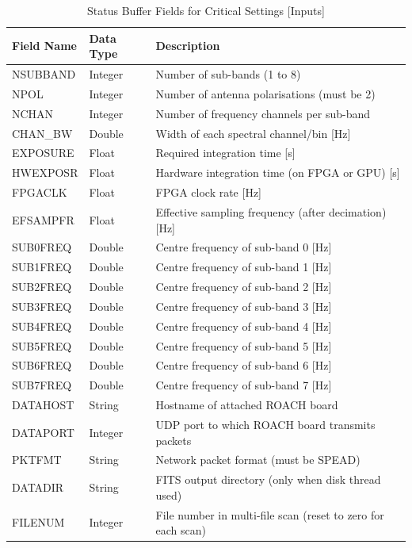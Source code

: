 \documentclass[11pt]{article} %
\begin{document}
\begin{table}[!h]
\centering
\caption{Status Buffer Fields for Critical Settings [Inputs]}
\begin{tabular}{l l l}
\hline
\bf Field Name & \bf Data Type & \bf Description \\
\hline
NSUBBAND & Integer & Number of sub-bands (1 to 8) \\
NPOL & Integer & Number of antenna polarisations (must be 2) \\
NCHAN & Integer &  Number of frequency channels per sub-band \\
CHAN\_BW & Double & Width of each spectral channel/bin [Hz]\\
EXPOSURE & Float & Required integration time [s] \\
HWEXPOSR & Float & Hardware integration time (on FPGA or GPU) [s]\\
FPGACLK & Float & FPGA clock rate [Hz] \\
EFSAMPFR & Float & Effective sampling frequency (after decimation) [Hz] \\
SUB0FREQ & Double & Centre frequency of sub-band 0 [Hz] \\
SUB1FREQ & Double & Centre frequency of sub-band 1 [Hz] \\
SUB2FREQ & Double & Centre frequency of sub-band 2 [Hz] \\
SUB3FREQ & Double & Centre frequency of sub-band 3 [Hz] \\
SUB4FREQ & Double & Centre frequency of sub-band 4 [Hz] \\
SUB5FREQ & Double & Centre frequency of sub-band 5 [Hz] \\
SUB6FREQ & Double & Centre frequency of sub-band 6 [Hz] \\
SUB7FREQ & Double & Centre frequency of sub-band 7 [Hz] \\
DATAHOST & String & Hostname of attached ROACH board \\
DATAPORT & Integer & UDP port to which ROACH board transmits packets \\
PKTFMT & String &  Network packet format (must be SPEAD) \\
DATADIR & String & FITS output directory (only when disk thread used) \\
FILENUM & Integer & File number in multi-file scan (reset to zero for each scan) \\
\hline
\end{tabular}
\label{status-buffer-critical}
\end{table}
\end{document}
